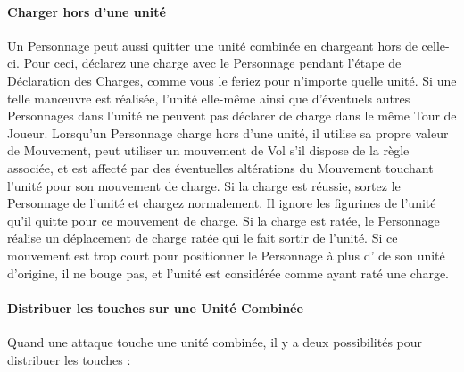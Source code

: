 \paragraph{Charger hors d'une unité}

Un Personnage peut aussi quitter une unité combinée en chargeant hors de celle-ci. Pour ceci, déclarez une charge avec le Personnage pendant l'étape de Déclaration des Charges, comme vous le feriez pour n'importe quelle unité. Si une telle manœuvre est réalisée, l'unité elle-même ainsi que d'éventuels autres Personnages dans l'unité ne peuvent pas déclarer de charge dans le même Tour de Joueur.  Lorsqu'un Personnage charge hors d'une unité, il utilise sa propre valeur de Mouvement, peut utiliser un mouvement de Vol s'il dispose de la règle associée, et est affecté par des éventuelles altérations du Mouvement touchant l'unité pour son mouvement de charge. Si la charge est réussie, sortez le Personnage de l'unité et chargez normalement. Il ignore les figurines de l'unité qu'il quitte pour ce mouvement de charge. Si la charge est ratée, le Personnage réalise un déplacement de charge ratée qui le fait sortir de l'unité. Si ce mouvement est trop court pour positionner le Personnage à plus d' de son unité d'origine, il ne bouge pas, et l'unité est considérée comme ayant raté une charge.

\paragraph{Distribuer les touches sur une Unité Combinée}
\label{distributing_hits_at_combined_units}

Quand une attaque touche une unité combinée, il y a deux possibilités pour distribuer les touches :


